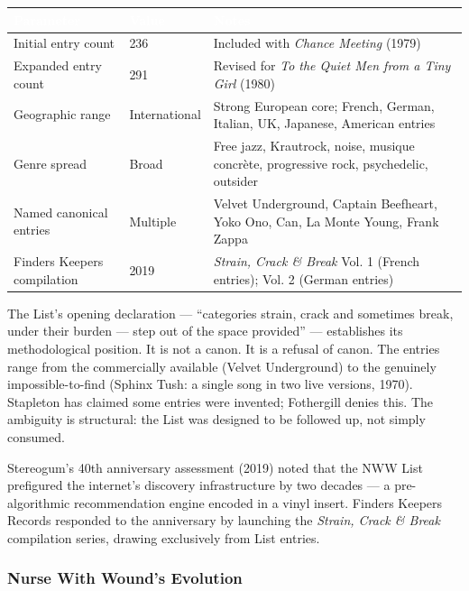 \documentclass[11pt,letterpaper]{article}
\newcommand{\tableheader}[1]{\textbf{\sffamily\textcolor{white}{#1}}}
\begin{document}
\begin{center}
\begin{tabularx}{\textwidth}{L{3cm}C{2cm}X}
\toprule
{}
\tableheader{Parameter} & \tableheader{Value} & \tableheader{Notes} \\
\midrule
Initial entry count & 236 & Included with \textit{Chance Meeting} (1979) \\
Expanded entry count & 291 & Revised for \textit{To the Quiet Men from a Tiny Girl} (1980) \\
Geographic range & International & Strong European core; French, German, Italian, UK, Japanese, American entries \\
Genre spread & Broad & Free jazz, Krautrock, noise, musique concrète, progressive rock, psychedelic, outsider \\
Named canonical entries & Multiple & Velvet Underground, Captain Beefheart, Yoko Ono, Can, La Monte Young, Frank Zappa \\
Finders Keepers compilation & 2019 & \textit{Strain, Crack \& Break} Vol. 1 (French entries); Vol. 2 (German entries) \\
\bottomrule
\end{tabularx}
\end{center}

The List's opening declaration — ``categories strain, crack and sometimes break, under their
burden — step out of the space provided'' — establishes its methodological position. It is not
a canon. It is a refusal of canon. The entries range from the commercially available (Velvet
Underground) to the genuinely impossible-to-find (Sphinx Tush: a single song in two live versions,
1970). Stapleton has claimed some entries were invented; Fothergill denies this. The ambiguity is
structural: the List was designed to be followed up, not simply consumed.

Stereogum's 40th anniversary assessment (2019) noted that the NWW List prefigured the internet's
discovery infrastructure by two decades — a pre-algorithmic recommendation engine encoded in
a vinyl insert. Finders Keepers Records responded to the anniversary by launching the
\textit{Strain, Crack \& Break} compilation series, drawing exclusively from List entries.

\subsubsection{Nurse With Wound's Evolution}
\end{document}
